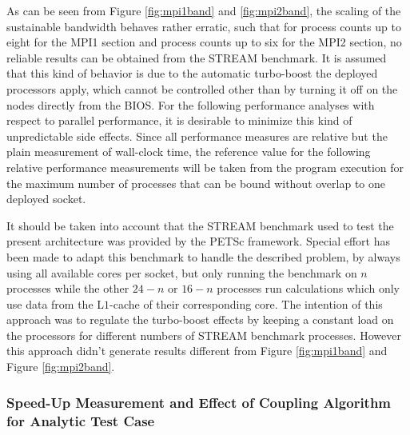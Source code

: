 As can be seen from Figure \ref{fig:mpi1band} and \ref{fig:mpi2band}, the scaling of the sustainable bandwidth behaves rather erratic, such that for process counts up to eight for the MPI1 section and process counts up to six for the MPI2 section, no reliable results can be obtained from the STREAM benchmark. It is assumed that this kind of behavior is due to the automatic turbo-boost the deployed processors apply, which cannot be controlled other than by turning it off on the nodes directly from the BIOS. For the following performance analyses with respect to parallel performance, it is desirable to minimize this kind of unpredictable side effects. Since all performance measures are relative but the plain measurement of wall-clock time, the reference value for the following relative performance measurements will be taken from the program execution for the maximum number of processes that can be bound without overlap to one deployed socket.

It should be taken into account that the STREAM benchmark used to test the present architecture was provided by the PETSc framework. Special effort has been made to adapt this benchmark to handle the described problem, by always using all available cores per socket, but only running the benchmark on \(n\) processes while the other \(24 - n\) or \(16 - n\) processes run calculations which only use data from the L\(1\)-cache of their corresponding core. The intention of this approach was to regulate the turbo-boost effects by keeping a constant load on the processors for different numbers of STREAM benchmark processes. However this approach didn't generate results different from Figure \ref{fig:mpi1band} and Figure \ref{fig:mpi2band}.

\subsubsection{Speed-Up Measurement and Effect of Coupling Algorithm for Analytic Test Case}
\label{sec:speedup}

